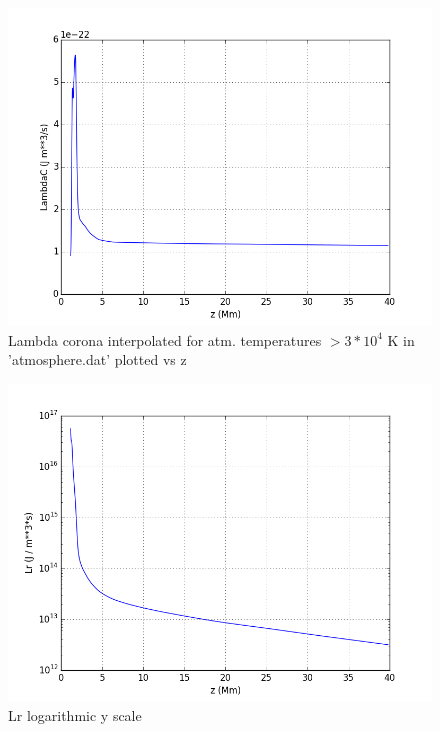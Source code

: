\documentclass[10pt]{book}
\begin{document}
\begin{figure}[!ht]
 \centering
 \includegraphics[scale=0.5]{interpLambdaC.png}
 \caption{ Lambda corona interpolated for atm. temperatures $> 3 * 10^4$ K in 'atmosphere.dat' plotted vs z}
\end{figure}

\begin{figure}[!ht]
 \centering
 \includegraphics[scale=0.5]{Lr.png}
 \caption{ Lr logarithmic y scale}
\end{figure}
\end{document}
